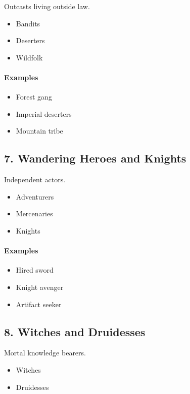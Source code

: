 \documentclass[a4paper,12pt]{article}
\begin{document}
Outcasts living outside law.

\begin{itemize}
\item Bandits
\item Deserters
\item Wildfolk
\end{itemize}

\paragraph{Examples}
\begin{itemize}
\item Forest gang
\item Imperial deserters
\item Mountain tribe
\end{itemize}



\subsection{7. Wandering Heroes and Knights}

Independent actors.

\begin{itemize}
\item Adventurers
\item Mercenaries
\item Knights
\end{itemize}

\paragraph{Examples}
\begin{itemize}
\item Hired sword
\item Knight avenger
\item Artifact seeker
\end{itemize}



\subsection{8. Witches and Druidesses}

Mortal knowledge bearers.

\begin{itemize}
\item Witches
\item Druidesses
\end{itemize}
\end{document}
